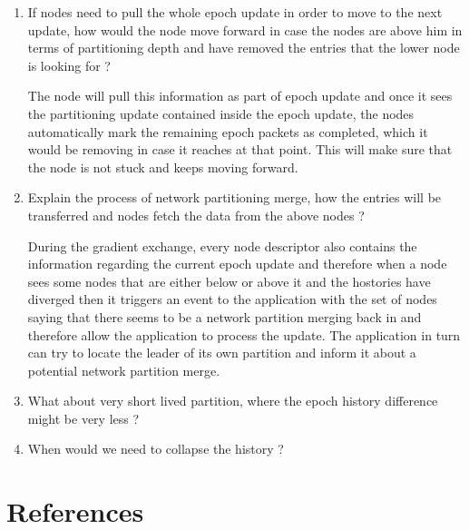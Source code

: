 \documentclass[a4paper, 11pt]{article}
\begin{document}
\begin{enumerate}

\item If nodes need to pull the whole epoch update in order to move to the next update, how would the node move forward in case the nodes are above him in terms of partitioning depth and have removed the entries that the lower node is looking for ?

The node will pull this information as part of epoch update and once it sees the partitioning update contained inside the epoch update, the nodes automatically mark the remaining epoch packets as completed, which it would be removing in case it reaches at that point. This will make sure that the node is not stuck and keeps moving forward.


\item Explain the process of network partitioning merge, how the entries will  be transferred and nodes fetch the data from the above nodes ?

During the gradient exchange, every node descriptor also contains the information regarding the current epoch update and therefore when a node sees some nodes that are either below or above it and the hostories have diverged then it triggers an event to the application with the set of nodes saying that there seems to be a network partition merging back in and therefore allow the application to process the update. The application in turn can try to locate the leader of its own partition and inform it about a potential network partition merge.


\item What about very short lived partition, where the epoch history difference might be very less ?

\item When would we need to collapse the history ?

\end{enumerate}


\section{References}
\end{document}
